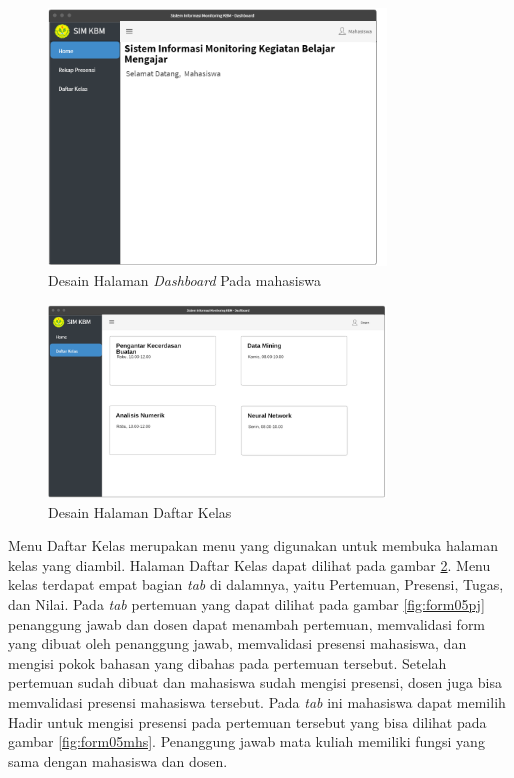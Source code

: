 \begin{figure}[h!]
	\centering
	\includegraphics[width=0.8\textwidth]{gambar/mockup/home_mahasiswa}
	\caption{Desain Halaman \textit{Dashboard} Pada mahasiswa}
	\label{fig:dashboard}
\end{figure}

\begin{figure}[h!]
	\centering
	\includegraphics[width=0.8\textwidth]{gambar/mockup/daftar_kelas}
	\caption{Desain Halaman Daftar Kelas}
	\label{fig:daftarkelas}
\end{figure}

Menu Daftar Kelas merupakan menu yang digunakan untuk membuka halaman kelas yang diambil. Halaman Daftar Kelas dapat dilihat pada gambar \ref{fig:daftarkelas}. Menu kelas terdapat empat bagian \textit{tab} di dalamnya, yaitu Pertemuan, Presensi, Tugas, dan Nilai. Pada \textit{tab} pertemuan yang dapat dilihat pada gambar \ref{fig:form05pj} penanggung jawab dan dosen dapat menambah pertemuan, memvalidasi form yang dibuat oleh penanggung jawab, memvalidasi presensi mahasiswa, dan mengisi pokok bahasan yang dibahas pada pertemuan tersebut. Setelah pertemuan sudah dibuat dan mahasiswa sudah mengisi presensi, dosen juga bisa memvalidasi presensi mahasiswa tersebut. Pada \textit{tab} ini mahasiswa dapat memilih Hadir untuk mengisi presensi pada pertemuan tersebut yang bisa dilihat pada gambar \ref{fig:form05mhs}. Penanggung jawab mata kuliah memiliki fungsi yang sama dengan mahasiswa dan dosen.



